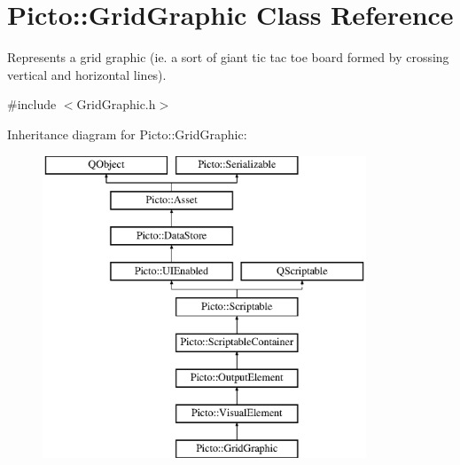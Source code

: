 \hypertarget{class_picto_1_1_grid_graphic}{\section{Picto\-:\-:Grid\-Graphic Class Reference}
\label{class_picto_1_1_grid_graphic}
}


Represents a grid graphic (ie. a sort of giant tic tac toe board formed by crossing vertical and horizontal lines).  




{\ttfamily \#include $<$Grid\-Graphic.\-h$>$}

Inheritance diagram for Picto\-:\-:Grid\-Graphic\-:\begin{figure}[H]
\begin{center}
\leavevmode
\includegraphics[height=9.000000cm]{class_picto_1_1_grid_graphic}
\end{center}
\end{figure}
